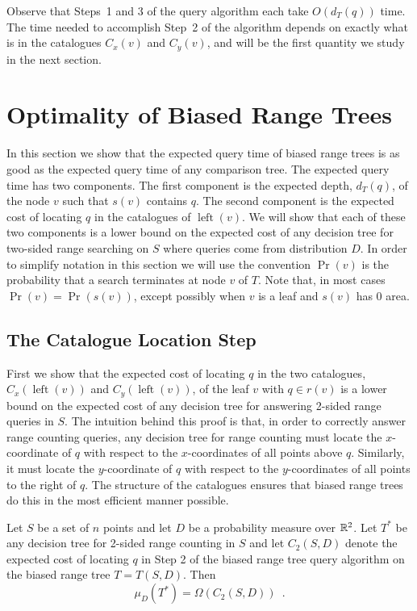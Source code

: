 \documentclass[lotsofwhite,charterfonts]{patmorin}
\DeclareMathOperator{\lft}{left}
\begin{document}
Observe that Steps~1 and 3 of the query algorithm each take
$O(d_T(q))$ time.  The time needed to accomplish Step~2 of the
algorithm depends on exactly what is in the catalogues $C_x(v)$ and
$C_y(v)$, and will be the first quantity we study in the next section.

\section{Optimality of Biased Range Trees}

In this section we show that the expected query time of biased range
trees is as good as the expected query time of any comparison tree.
The expected query time has two components.  The first component is
the expected depth, $d_T(q)$,  of the node $v$ such that $s(v)$
contains $q$.  The second component is the expected cost of locating
$q$ in the catalogues of $\lft(v)$.  We will show that each of these
two components is a lower bound on the expected cost of any decision
tree for two-sided range searching on $S$ where queries come from
distribution $D$.  In order to simplify notation in this section we
will use the convention $\Pr(v)$ is the probability that a search
terminates at node $v$ of $T$.  Note that, in most cases
$\Pr(v)=\Pr(s(v))$, except possibly when $v$ is a leaf and $s(v)$ has
0 area.

\subsection{The Catalogue Location Step}

First we show that the expected cost of locating $q$ in the two
catalogues, $C_x(\lft(v))$ and $C_y(\lft(v))$, of the leaf $v$
with $q\in r(v)$ is
a lower bound on the expected cost of any decision tree for answering
2-sided range queries in $S$.  The intuition behind this proof is
that, in order to correctly answer range counting queries, any decision tree
for range counting must locate the $x$-coordinate of $q$
with respect to the $x$-coordinates of all points above $q$.  
Similarly, it must locate the $y$-coordinate of $q$ with respect to
the $y$-coordinates of all points to the right of $q$.  The structure
of the catalogues ensures that biased range trees do this in the most
efficient manner possible.
 

\begin{lem}
Let $S$ be a set of $n$ points and let $D$ be a probability measure
over $\mathbb{R}^2$.
Let $T^*$ be any decision tree for 2-sided range counting in $S$ and let
$C_2(S,D)$ denote the expected cost of locating $q$ in Step 2 of the
biased range tree query algorithm on the biased range tree $T=T(S,D)$. 
Then
\[
  \mu_D(T^*) = \Omega(C_2(S,D)) \enspace .
\] 
\end{lem}
\end{document}
